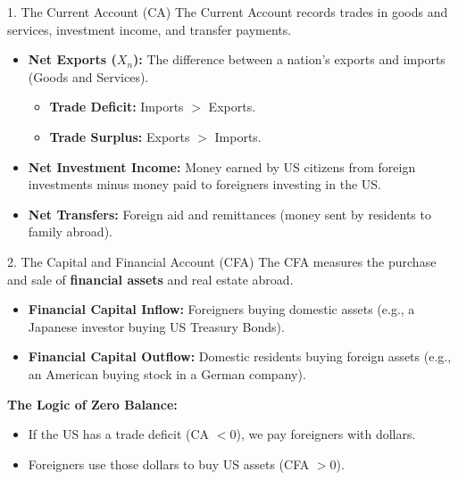 \documentclass[aspectratio=169]{beamer}
\begin{document}
\begin{frame}{1. The Current Account (CA)}
    The Current Account records trades in goods and services, investment income, and transfer payments.
    \vspace{0.5cm}
    \begin{itemize}
        \item \textbf{Net Exports ($X_n$):} The difference between a nation's exports and imports (Goods and Services).
        \begin{itemize}
            \item \textbf{Trade Deficit:} Imports $>$ Exports.
            \item \textbf{Trade Surplus:} Exports $>$ Imports.
        \end{itemize}
        \item \textbf{Net Investment Income:} Money earned by US citizens from foreign investments minus money paid to foreigners investing in the US.
        \item \textbf{Net Transfers:} Foreign aid and remittances (money sent by residents to family abroad).
    \end{itemize}
\end{frame}

\begin{frame}{2. The Capital and Financial Account (CFA)}
    The CFA measures the purchase and sale of \textbf{financial assets} and real estate abroad.
    \vspace{0.5cm}
    \begin{itemize}
        \item \textbf{Financial Capital Inflow:} Foreigners buying domestic assets (e.g., a Japanese investor buying US Treasury Bonds).
        \item \textbf{Financial Capital Outflow:} Domestic residents buying foreign assets (e.g., an American buying stock in a German company).
    \end{itemize}
    \vspace{0.5cm}
    \textbf{The Logic of Zero Balance:}
    \begin{itemize}
        \item If the US has a trade deficit (CA $< 0$), we pay foreigners with dollars.
        \item Foreigners use those dollars to buy US assets (CFA $> 0$).
    \end{itemize}
\end{frame}

\end{document}
